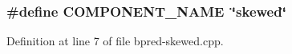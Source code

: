 \subsubsection[{COMPONENT\_\-NAME}]{\setlength{\rightskip}{0pt plus 5cm}\#define COMPONENT\_\-NAME~\char`\"{}skewed\char`\"{}}\label{bpred-skewed_8cpp_9146ade7ce24e3db226a973a59063892}




Definition at line 7 of file bpred-skewed.cpp.